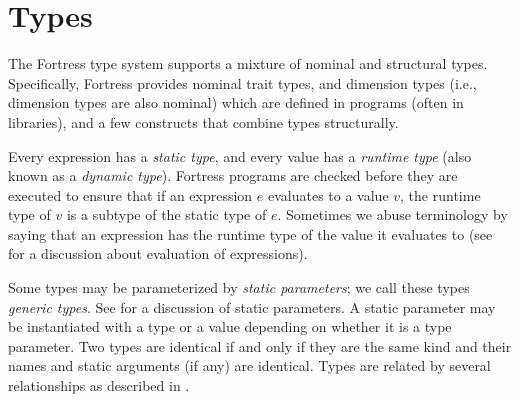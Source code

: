 %
%
%
%

\chapter{Types}



The Fortress type system supports a mixture of nominal and structural types.
Specifically,
Fortress provides nominal trait types,
and dimension types (i.e., dimension types are also nominal)
which are defined in programs (often in libraries),
and a few constructs that combine types structurally.

Every expression has a \emph{static type},
and every value has a \emph{runtime type}
(also known as a \emph{dynamic type}).
Fortress programs are checked before they are executed to ensure that if
an expression $e$ evaluates to a value $v$, the runtime type of $v$ is a
subtype of the static type of $e$.
Sometimes we abuse terminology by saying that
an expression has the runtime type of the value it evaluates to
(see  for a discussion about evaluation of expressions).

Some types may be parameterized by \emph{static parameters};
we call these types \emph{generic types}.
See  for a discussion of static parameters.
A static parameter may be instantiated with a type or a value
depending on whether it is a type parameter.
Two types are identical if and only if they are the same kind and
their names and static arguments (if any) are identical.
Types are related by several relationships as described in
.

